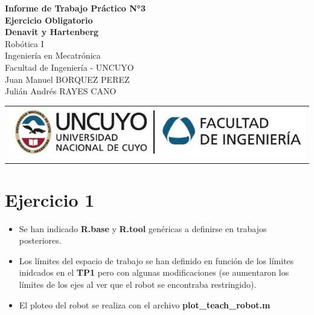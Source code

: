 \documentclass[a4paper,12pt]{article}
\begin{document}
\begin{titlepage}
    \centering
    \vspace*{5cm}
    {\Huge\bfseries Informe de Trabajo Práctico N°3}\\
    \vspace{0.2cm}
    {\Large \textbf{Ejercicio Obligatorio}}\\
    \vspace{0.5cm}
    {\Large \textbf{Denavit y Hartenberg}}\\
    \vspace{0.5cm}
    {\Large Robótica I}\\
    \vspace{0.5 cm}
    {\Large Ingeniería en Mecatrónica}\\
    \vspace{0.2 cm}
    {\Large Facultad de Ingeniería - UNCUYO}\\
    \vspace{1.5cm}
    Juan Manuel BORQUEZ PEREZ\\
    Julián Andrés RAYES CANO\\
    \vfill
    {\begin{tabular}{@{}c@{}}\includegraphics[scale=0.4]{escudo.PNG}\end{tabular}}\hspace{10pt}
\end{titlepage}

\section{Ejercicio 1}

\begin{itemize}
    \item Se han indicado \textbf{R.base} y \textbf{R.tool} genéricas a definirse en trabajos posteriores.
    \item Los límites del espacio de trabajo se han definido en función de los límites inidcados en el \textbf{TP1} pero con algunas modificaciones (se aumentaron los límites de los ejes al ver que el robot se encontraba restringido).
    \item El ploteo del robot se realiza con el archivo \textbf{plot\_teach\_robot.m}
\end{itemize}
\end{document}
